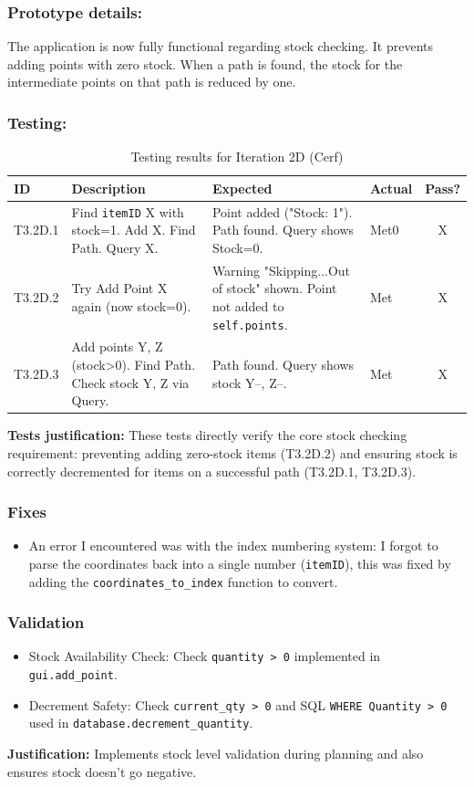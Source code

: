 \newpage

\subsubsection{Prototype details:}
The application is now fully functional regarding stock checking. It prevents adding points with zero stock. When a path is found, the stock for the intermediate points on that path is reduced by one.

\subsubsection{Testing:}
\begin{table}[htbp]
	\centering
	\begin{tabularx}{\textwidth}{|l|X|p{4.5cm}|p{1.5cm}|c|}
		\hline
		\textbf{ID} & \textbf{Description} & \textbf{Expected} & \textbf{Actual} & \textbf{Pass?} \\
		\hline
		T3.2D.1 & Find \verb|itemID| X with stock=1. Add X. Find Path. Query X. & Point added ("Stock: 1"). Path found. Query shows Stock=0. & Met0 & X \\
		\hline
		T3.2D.2 & Try Add Point X again (now stock=0). & Warning "Skipping...Out of stock" shown. Point not added to \verb|self.points|. & Met & X \\
		\hline
		T3.2D.3 & Add points Y, Z (stock>0). Find Path. Check stock Y, Z via Query. & Path found. Query shows stock Y--, Z--. & Met & X \\
		\hline
	\end{tabularx}
	\caption{Testing results for Iteration 2D (Cerf)}
\end{table}
\textbf{Tests justification:} These tests directly verify the core stock checking requirement: preventing adding zero-stock items (T3.2D.2) and ensuring stock is correctly decremented for items on a successful path (T3.2D.1, T3.2D.3).

\subsubsection{Fixes}
\begin{itemize}
	\item An error I encountered was with the index numbering system: I forgot to parse the coordinates back into a single number (\verb|itemID|), this was fixed by adding the \verb*|coordinates_to_index| function to convert.
\end{itemize}

\subsubsection{Validation}
\begin{itemize}
	\item Stock Availability Check: Check \verb|quantity > 0| implemented in \verb|gui.add_point|.
	\item Decrement Safety: Check \verb|current_qty > 0| and SQL \verb|WHERE Quantity > 0| used in \verb|database.decrement_quantity|.
\end{itemize}
\textbf{Justification:} Implements stock level validation during planning and also ensures stock doesn't go negative.


